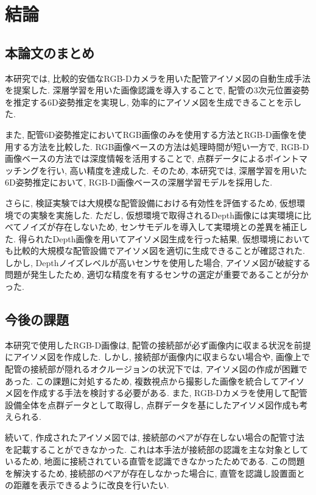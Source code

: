 ﻿\chapter{結論}
\section{本論文のまとめ}
本研究では, 比較的安価なRGB-Dカメラを用いた配管アイソメ図の自動生成手法を提案した. 
深層学習を用いた画像認識を導入することで, 配管の3次元位置姿勢を推定する6D姿勢推定を実現し, 効率的にアイソメ図を生成できることを示した. 

また, 配管6D姿勢推定においてRGB画像のみを使用する方法とRGB-D画像を使用する方法を比較した. 
RGB画像ベースの方法は処理時間が短い一方で, RGB-D画像ベースの方法では深度情報を活用することで, 点群データによるポイントマッチングを行い, 高い精度を達成した. 
そのため, 本研究では, 深層学習を用いた6D姿勢推定において, RGB-D画像ベースの深層学習モデルを採用した. 

さらに, 検証実験では大規模な配管設備における有効性を評価するため, 仮想環境での実験を実施した. 
ただし, 仮想環境で取得されるDepth画像には実環境に比べてノイズが存在しないため, センサモデルを導入して実環境との差異を補正した. 
得られたDepth画像を用いてアイソメ図生成を行った結果, 仮想環境においても比較的大規模な配管設備でアイソメ図を適切に生成できることが確認された. 
しかし, Depthノイズレベルが高いセンサを使用した場合, アイソメ図が破綻する問題が発生したため, 適切な精度を有するセンサの選定が重要であることが分かった. 

\section{今後の課題}
本研究で使用したRGB-D画像は, 配管の接続部が必ず画像内に収まる状況を前提にアイソメ図を作成した. 
しかし, 接続部が画像内に収まらない場合や, 画像上で配管の接続部が隠れるオクルージョンの状況下では, アイソメ図の作成が困難であった. 
この課題に対処するため, 複数視点から撮影した画像を統合してアイソメ図を作成する手法を検討する必要がある. 
また, RGB-Dカメラを使用して配管設備全体を点群データとして取得し, 点群データを基にしたアイソメ図作成も考えられる. 

続いて, 作成されたアイソメ図では, 接続部のペアが存在しない場合の配管寸法を記載することができなかった. 
これは本手法が接続部の認識を主な対象としているため, 地面に接続されている直管を認識できなかったためである. 
この問題を解決するため, 接続部のペアが存在しなかった場合に, 直管を認識し設置面との距離を表示できるように改良を行いたい. 
